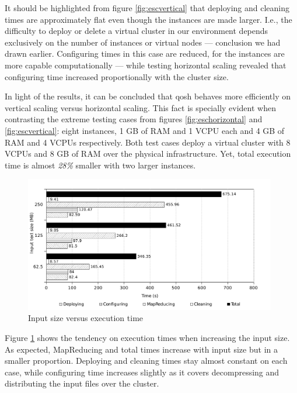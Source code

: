 It should be highlighted from figure \ref{fig:escvertical} that deploying and cleaning times are approximately flat even though the instances are made larger. I.e., the difficulty to deploy or delete a virtual cluster in our environment depends exclusively on the number of instances or virtual nodes --- conclusion we had drawn earlier. Configuring times in this case are reduced, for the instances are more capable computationally --- while testing horizontal scaling revealed that configuring time increased proportionally with the cluster size.

In light of the results, it can be concluded that qosh behaves more efficiently on vertical scaling versus horizontal scaling. This fact is specially evident when contrasting the extreme testing cases from figures \ref{fig:eschorizontal} and \ref{fig:escvertical}: eight instances, 1 GB of RAM and 1 VCPU each and 4 GB of RAM and 4 VCPUs respectively. Both test cases deploy a virtual cluster with 8 VCPUs and 8 GB of RAM over the physical infrastructure. Yet, total execution time is almost \emph{28\%} smaller with two larger instances.

\begin{figure}[tbp]
\begin{center}
\includegraphics[width=0.98\textwidth]{imagenes/042bw.pdf}
\caption{Input size versus execution time}
\label{fig:evotemporal}
\end{center}
\end{figure}

Figure \ref{fig:evotemporal} shows the tendency on execution times when increasing the input size. As expected, MapReducing and total times increase with input size but in a smaller proportion. Deploying and cleaning times stay almost constant on each case, while configuring time increases slightly as it covers decompressing and distributing the input files over the cluster.
